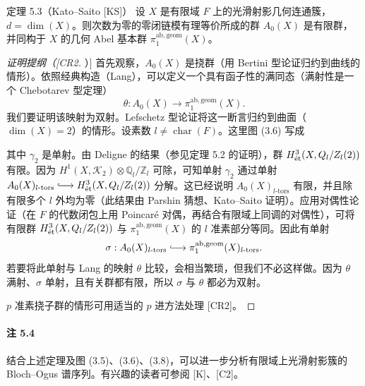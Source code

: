 \begin{statement}{定理 5.3（Kato--Saito [KS]）}
设 $X$ 是有限域 $F$ 上的光滑射影几何连通簇，$d=\dim(X)$。则次数为零的零闭链模有理等价所成的群 $A_0(X)$ 是有限群，并同构于 $X$ 的几何 Abel 基本群 $\pi_1^{\mathrm{ab,geom}}(X)$。
\end{statement}
\begin{proof}[证明提纲（[CR2]）]
首先观察，$A_0(X)$ 是挠群（用 Bertini 型论证归约到曲线的情形）。依照经典构造（Lang），可以定义一个具有函子性的满同态（满射性是一个 Chebotarev 型定理）
\[
\theta:A_0(X)\longrightarrow\pi_1^{\mathrm{ab,geom}}(X).
\]
我们要证明该映射为双射。Lefschetz 型论证将这一断言归约到曲面（$\dim(X)=2$）的情形。设素数 $l\ne\operatorname{char}(F)$。这里图 (3.6) 写成
\begin{center}
\end{center}
其中 $\gamma_2$ 是单射。由 Deligne 的结果（参见定理 5.2 的证明），群 $H^3_{\mathrm{\acute et}}(X,Q_l/Z_l(2))$ 有限。因为 $H^1(X,\mathcal K_2)\otimes\mathbb Q_l/\mathbb Z_l$ 可除，可知单射 $\gamma_2$ 通过单射 $A_0(X)_{l\text{-}\mathrm{tors}}\lhook\joinrel\longrightarrow H^3_{\et}(X,\mathbb Q_l/\mathbb Z_l(2))$ 分解。这已经说明 $A_0(X)_{l\text{-}\mathrm{tors}}$ 有限，并且除有限多个 $l$ 外均为零（此结果由 Parshin 猜想、Kato--Saito 证明）。应用对偶性论证（在 $F$ 的代数闭包上用 Poincaré 对偶，再结合有限域上同调的对偶性），可将有限群 $H^3_{\mathrm{\acute et}}(X,Q_l/Z_l(2))$ 与 $\pi_1^{\mathrm{ab,geom}}(X)$ 的 $l$ 准素部分等同。因此有单射
\[
\sigma:A_0(X)_{l\text{-}\mathrm{tors}}\lhook\joinrel\longrightarrow\pi_1^{\mathrm{ab,geom}}(X)_{l\text{-}\mathrm{tors}}.
\]
若要将此单射与 Lang 的映射 $\theta$ 比较，会相当繁琐，但我们不必这样做。因为 $\theta$ 满射、$\sigma$ 单射，且有关群都有限，所以 $\sigma$ 与 $\theta$ 都必为双射。

$p$ 准素挠子群的情形可用适当的 $p$ 进方法处理 [CR2]。
\end{proof}
\paragraph{注 5.4}
结合上述定理及图 (3.5)、(3.6)、(3.8)，可以进一步分析有限域上光滑射影簇的 Bloch--Ogus 谱序列。有兴趣的读者可参阅 [K]、[C2]。

